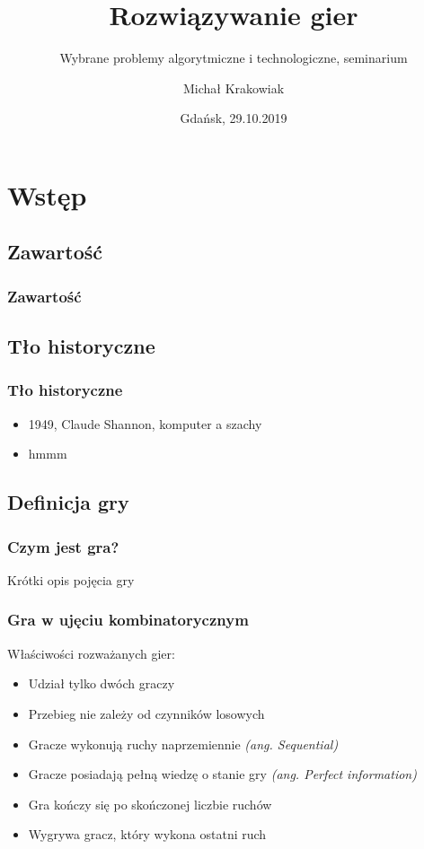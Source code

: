 \documentclass[polish,envcountsect,10pt]{beamer}
\title{Rozwiązywanie gier}
\author{Michał Krakowiak}
\subtitle{Wybrane problemy algorytmiczne i technologiczne, seminarium}
\date{Gdańsk, 29.10.2019}
\begin{document}
    \frame{\titlepage}
    \section{Wstęp}
        \subsection{Zawartość}
            \begin{frame}
                \frametitle{Zawartość}
                \tableofcontents[pausesections]
            \end{frame}
        \subsection{Tło historyczne}
            \begin{frame}
                \frametitle{Tło historyczne}
                \begin{itemize}
                    \item<1-> 1949, Claude Shannon, komputer a szachy
                    \item<2-> hmmm
                \end{itemize}
            \end{frame}
        \subsection{Definicja gry}
            \begin{frame}
                \frametitle{Czym jest gra?}
                Krótki opis pojęcia gry
            \end{frame}
            \begin{frame}
                \frametitle{Gra w ujęciu kombinatorycznym}
                Właściwości rozważanych gier:
                \begin{itemize}
                    \item<2-> Udział tylko dwóch graczy
                    \item<3-> Przebieg nie zależy od czynników losowych
                    \item<4-> Gracze wykonują ruchy naprzemiennie \textit{(ang. Sequential)}
                    \item<5-> Gracze posiadają pełną wiedzę o stanie gry \textit{(ang. Perfect information)}
                    \item<6-> Gra kończy się po skończonej liczbie ruchów
                    \item<7-> Wygrywa gracz, który wykona ostatni ruch
                \end{itemize}
            \end{frame}
\end{document}
